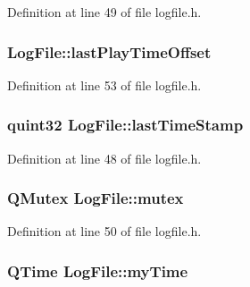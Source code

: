 Definition at line 49 of file logfile.\-h.

\hypertarget{class_log_file_aa035b77c73dbb55b3e37108f377ba657}{
\subsubsection[{last\-Play\-Time\-Offset}]{ Log\-File\-::last\-Play\-Time\-Offset\hspace{0.3cm}{\ttfamily [protected]}}}\label{class_log_file_aa035b77c73dbb55b3e37108f377ba657}


Definition at line 53 of file logfile.\-h.

\hypertarget{class_log_file_aef839a3a5211389d9d302206012d4402}{
\subsubsection[{last\-Time\-Stamp}]{\setlength{\rightskip}{0pt plus 5cm}quint32 Log\-File\-::last\-Time\-Stamp\hspace{0.3cm}{\ttfamily [protected]}}}\label{class_log_file_aef839a3a5211389d9d302206012d4402}


Definition at line 48 of file logfile.\-h.

\hypertarget{class_log_file_a879a7dd05d179c71f683f39106cb3c8f}{
\subsubsection[{mutex}]{\setlength{\rightskip}{0pt plus 5cm}Q\-Mutex Log\-File\-::mutex\hspace{0.3cm}{\ttfamily [protected]}}}\label{class_log_file_a879a7dd05d179c71f683f39106cb3c8f}


Definition at line 50 of file logfile.\-h.

\hypertarget{class_log_file_ac0bbc6cc818c7e061a98b586f967d8da}{
\subsubsection[{my\-Time}]{\setlength{\rightskip}{0pt plus 5cm}Q\-Time Log\-File\-::my\-Time\hspace{0.3cm}{\ttfamily [protected]}}}\label{class_log_file_ac0bbc6cc818c7e061a98b586f967d8da}



